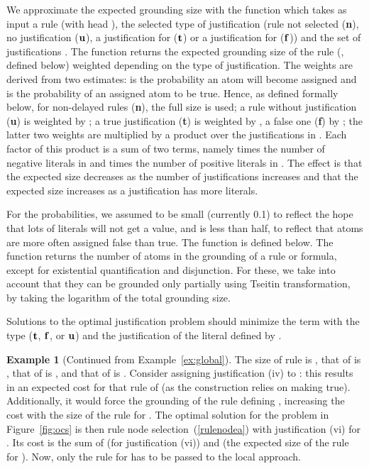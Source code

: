 \documentclass[11pt]{article}
\newcommand{\m}[1]{\ensuremath{#1}\xspace}
\newcommand{\trval}[1]{\m{{\bf #1}}}
\newcommand{\ltrue}{\trval{t}}
\newcommand{\lfalse}{\trval{f}}
\newcommand{\lunkn}{\trval{u}}
\theoremstyle{plain}
\theoremstyle{definition}
\theoremstyle{example_basic}
\newtheorem{example}[thm]{Example}
\theoremstyle{example_contd}
\theoremstyle{plain}
\newcommand{\tbf}[1]{\textbf{#1}}
\newcommand{\change}[1]{#1}
\begin{document}
We approximate the expected grounding size with the function
 which takes as input a rule  \change{(with head )},
the selected type of justification (rule not selected (\tbf{n}), no
justification (\lunkn), \change{a justification for  (\ltrue) or a
justification for  (\lfalse))} and the set of justifications
. \change{The function returns the expected grounding size of the
  rule (, defined below) weighted depending on the type of
  justification. The weights are derived from two estimates: 
  is the probability an atom will become assigned and  is the
  probability of an assigned atom to be true. Hence, as defined
  formally below, for non-delayed rules (\tbf{n}), the full size is
  used; a rule without justification (\tbf{u}) is weighted by
  ; a true justification (\tbf{t}) is weighted by , a
  false one (\tbf{f}) by ; the latter two weights are
  multiplied by a product over the justifications  in . Each factor
  of this product is a sum of two terms, namely  times the
  number of negative literals in   and  times the number
  of positive literals in . The effect is that the
  expected size decreases as the number of justifications increases
  and that the expected size increases as a justification has more
  literals. 

For the probabilities, we assumed  to be small (currently 0.1) to reflect the hope that lots of literals will not get a value, and  is less than half, to reflect that atoms are more often assigned false than true.}
\change{The function  is defined below. The function returns the number of atoms in the grounding of a rule or formula, except for existential quantification and disjunction. For these, we take into account that they can be grounded only partially using Tseitin transformation, by taking the logarithm of the total grounding size.
}
Solutions to the optimal justification problem should minimize the
term  with  
\change{the type (\ltrue, \lfalse, or \lunkn) and  the justification of the literal defined by .}


 \begin{example}[Continued from Example~\ref{ex:global}]
The size of rule  is , that of  is ,  that of  is , and that of  is .
Consider assigning justification (iv) to : this results in an expected cost for that rule of  (as the construction relies on making  true). Additionally, it would force the grounding of the rule defining , increasing the cost with the size of the rule for .
The optimal solution for the problem in Figure~\ref{fig:ocs} is then rule node selection~(\ref{rulenodea}) with justification (vi) for . Its cost is the sum of  (for justification (vi)) and  (the expected size of the rule for ). Now, only the rule for  has to be passed to the local approach.
 \end{example}
\end{document}
